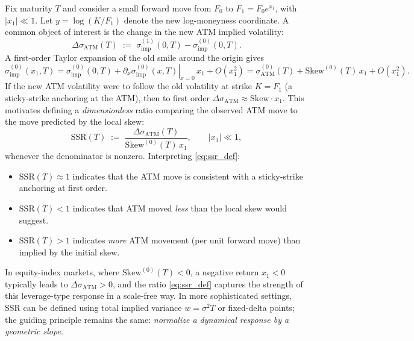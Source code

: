 \documentclass[11pt,a4paper]{report}
\begin{document}
Fix maturity $T$ and consider a small forward move from $F_0$ to $F_1=F_0 e^{x_1}$, with $|x_1|\ll 1$.
Let $y=\log(K/F_1)$ denote the new log-moneyness coordinate.
A common object of interest is the change in the new ATM implied volatility:
\begin{equation}
\Delta \sigma_{\mathrm{ATM}}(T)
\;:=\;
\sigma_{\mathrm{imp}}^{(1)}(0,T) - \sigma_{\mathrm{imp}}^{(0)}(0,T).
\end{equation}
A first-order Taylor expansion of the old smile around the origin gives
\begin{equation}
\sigma_{\mathrm{imp}}^{(0)}(x_1,T)
=
\sigma_{\mathrm{imp}}^{(0)}(0,T)
+
\left.\partial_x\sigma_{\mathrm{imp}}^{(0)}(x,T)\right|_{x=0}\,x_1
+O(x_1^2)
=
\sigma_{\mathrm{ATM}}^{(0)}(T)
+
\mathrm{Skew}^{(0)}(T)\,x_1
+O(x_1^2).
\label{eq:taylor_smile}
\end{equation}
If the new ATM volatility were to follow the old volatility at strike $K=F_1$ (a sticky-strike anchoring at the ATM), then to first order $\Delta\sigma_{\mathrm{ATM}} \approx \mathrm{Skew}\cdot x_1$.
This motivates defining a \emph{dimensionless} ratio comparing the observed ATM move to the move predicted by the local skew:
\begin{equation}
\mathrm{SSR}(T)
\;:=\;
\frac{\Delta \sigma_{\mathrm{ATM}}(T)}{\mathrm{Skew}^{(0)}(T)\,x_1},
\qquad |x_1|\ll 1,
\label{eq:ssr_def}
\end{equation}
whenever the denominator is nonzero.
Interpreting \eqref{eq:ssr_def}:
\begin{itemize}
\item $\mathrm{SSR}(T)\approx 1$ indicates that the ATM move is consistent with a sticky-strike anchoring at first order.
\item $\mathrm{SSR}(T) < 1$ indicates that ATM moved \emph{less} than the local skew would suggest.
\item $\mathrm{SSR}(T) > 1$ indicates \emph{more} ATM movement (per unit forward move) than implied by the initial skew.
\end{itemize}
In equity-index markets, where $\mathrm{Skew}^{(0)}(T)<0$, a negative return $x_1<0$ typically leads to $\Delta\sigma_{\mathrm{ATM}}>0$, and the ratio \eqref{eq:ssr_def} captures the strength of this leverage-type response in a scale-free way.
In more sophisticated settings, SSR can be defined using total implied variance $w=\sigma^2 T$ or fixed-delta points; the guiding principle remains the same: \emph{normalize a dynamical response by a geometric slope.}
\end{document}
